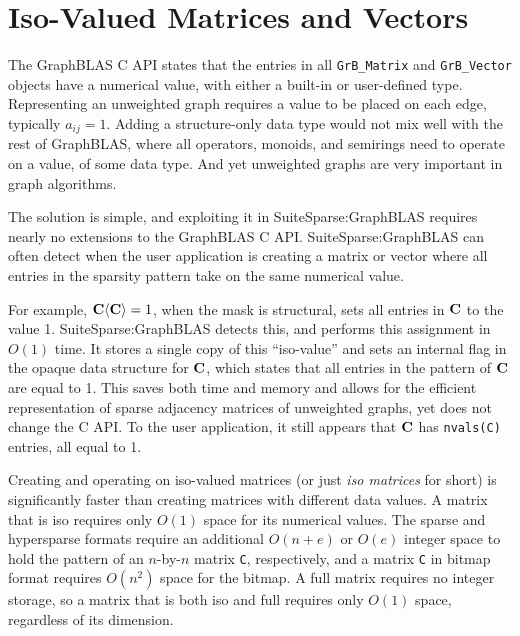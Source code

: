 \documentclass[12pt]{article}
\begin{document}
{\newpage
\section{Iso-Valued Matrices and Vectors } %
\label{iso}

The GraphBLAS C API states that the entries in all \verb'GrB_Matrix' and
\verb'GrB_Vector' objects have a numerical value, with either a built-in or
user-defined type.  Representing an unweighted graph requires a value to be
placed on each edge, typically $a_{ij}=1$.  Adding a structure-only data type
would not mix well with the rest of GraphBLAS, where all operators, monoids,
and semirings need to operate on a value, of some data type.  And yet
unweighted graphs are very important in graph algorithms.

The solution is simple, and exploiting it in SuiteSparse:GraphBLAS requires
nearly no extensions to the GraphBLAS C API.   SuiteSparse:GraphBLAS can often
detect when the user application is creating a matrix or vector where all
entries in the sparsity pattern take on the same numerical value.

For example, ${\bf C \langle C \rangle} = 1$, when the mask is structural, sets
all entries in $\bf C$ to the value 1.  SuiteSparse:GraphBLAS detects this, and
performs this assignment in $O(1)$ time.  It stores a single copy of this
``iso-value'' and sets an internal flag in the opaque data structure for $\bf
C$, which states that all entries in the pattern of $\bf C$ are equal to 1.
This saves both time and memory and allows for the efficient representation of
sparse adjacency matrices of unweighted graphs, yet does not change the C API.
To the user application, it still appears that $\bf C$ has \verb'nvals(C)'
entries, all equal to 1.

Creating and operating on iso-valued matrices (or just {\em iso matrices} for 
short) is significantly faster than creating matrices with different data
values.  A matrix that is iso requires only $O(1)$ space for its numerical
values.  The sparse and hypersparse formats require an additional $O(n+e)$ or
$O(e)$ integer space to hold the pattern of an $n$-by-$n$ matrix \verb'C',
respectively, and a matrix \verb'C' in bitmap format requires $O(n^2)$ space
for the bitmap.  A full matrix requires no integer storage, so a matrix that is
both iso and full requires only $O(1)$ space, regardless of its dimension.

}
\end{document}
